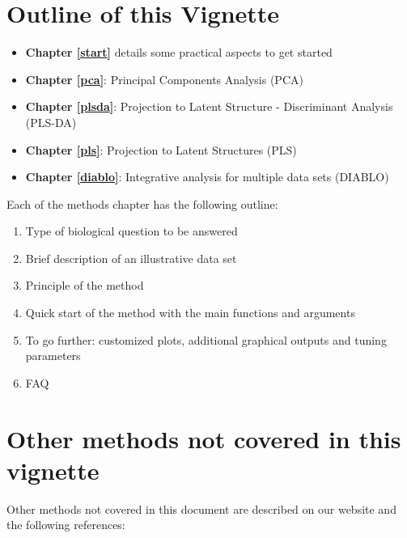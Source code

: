 \documentclass[]{book}
\providecommand{\tightlist}{%
  \setlength{\itemsep}{0pt}\setlength{\parskip}{0pt}}
\begin{document}
\hypertarget{outline-of-this-vignette}{%
\section{Outline of this Vignette}\label{outline-of-this-vignette}}

\begin{itemize}
\tightlist
\item
  \textbf{Chapter \ref{start}} details some practical aspects to get started
\item
  \textbf{Chapter \ref{pca}}: Principal Components Analysis (PCA)
\item
  \textbf{Chapter \ref{plsda}}: Projection to Latent Structure - Discriminant Analysis (PLS-DA)
\item
  \textbf{Chapter \ref{pls}}: Projection to Latent Structures (PLS)
\item
  \textbf{Chapter \ref{diablo}}: Integrative analysis for multiple data sets (DIABLO)
\end{itemize}

Each of the methods chapter has the following outline:

\begin{enumerate}
\def\labelenumi{\arabic{enumi}.}
\tightlist
\item
  Type of biological question to be answered
\item
  Brief description of an illustrative data set
\item
  Principle of the method
\item
  Quick start of the method with the main functions and arguments
\item
  To go further: customized plots, additional graphical outputs and tuning parameters
\item
  FAQ
\end{enumerate}

\hypertarget{other-methods-not-covered-in-this-vignette}{%
\section{Other methods not covered in this vignette}\label{other-methods-not-covered-in-this-vignette}}

Other methods not covered in this document are described on our website and the following references:
\end{document}
